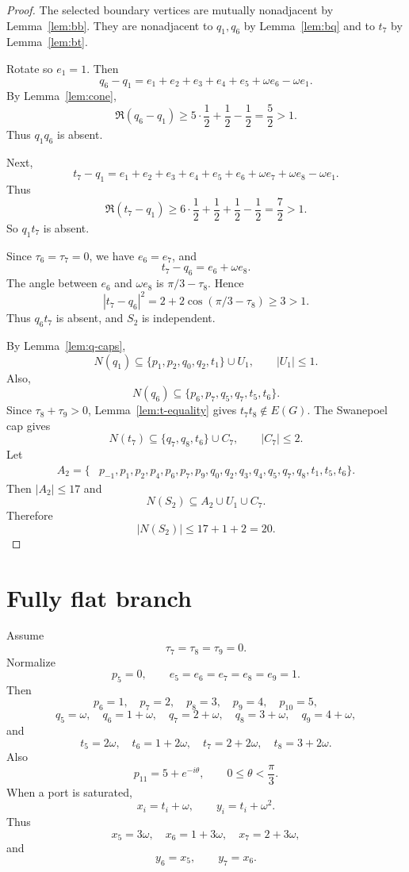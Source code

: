 \documentclass[11pt]{article}
\theoremstyle{plain}
\numberwithin{equation}{section}
\begin{document}
\begin{proof}
The selected boundary vertices are mutually nonadjacent by Lemma~\ref{lem:bb}. They are nonadjacent to $q_1,q_6$ by Lemma~\ref{lem:bq} and to $t_7$ by Lemma~\ref{lem:bt}.

Rotate so $e_1=1$. Then
\[
 q_6-q_1=e_1+e_2+e_3+e_4+e_5+\omega e_6-\omega e_1.
\]
By Lemma~\ref{lem:cone},
\[
 \Re(q_6-q_1)\ge5\cdot\frac12+\frac12-\frac12=\frac52>1.
\]
Thus $q_1q_6$ is absent.

Next,
\[
 t_7-q_1=e_1+e_2+e_3+e_4+e_5+e_6+\omega e_7+\omega e_8-\omega e_1.
\]
Thus
\[
 \Re(t_7-q_1)\ge6\cdot\frac12+\frac12+\frac12-\frac12=\frac72>1.
\]
So $q_1t_7$ is absent.

Since $\tau_6=\tau_7=0$, we have $e_6=e_7$, and
\[
 t_7-q_6=e_6+\omega e_8.
\]
The angle between $e_6$ and $\omega e_8$ is $\pi/3-\tau_8$. Hence
\[
 |t_7-q_6|^2=2+2\cos(\pi/3-\tau_8)\ge3>1.
\]
Thus $q_6t_7$ is absent, and $S_2$ is independent.

By Lemma~\ref{lem:q-caps},
\[
 N(q_1)\subseteq\{p_1,p_2,q_0,q_2,t_1\}\cup U_1,
 \qquad |U_1|\le1.
\]
Also,
\[
 N(q_6)\subseteq\{p_6,p_7,q_5,q_7,t_5,t_6\}.
\]
Since $\tau_8+\tau_9>0$, Lemma~\ref{lem:t-equality} gives $t_7t_8\notin E(G)$. The Swanepoel cap gives
\[
 N(t_7)\subseteq\{q_7,q_8,t_6\}\cup C_7,
 \qquad |C_7|\le2.
\]
Let
\[
\begin{aligned}
A_2=\{&p_{-1},p_1,p_2,p_4,p_6,p_7,p_9,q_0,q_2,q_3,q_4,q_5,q_7,q_8,t_1,t_5,t_6\}.
\end{aligned}
\]
Then $|A_2|\le17$ and
\[
 N(S_2)\subseteq A_2\cup U_1\cup C_7.
\]
Therefore
\[
 |N(S_2)|\le17+1+2=20.
\]
\end{proof}

\section{Fully flat branch}

Assume
\[
 \tau_7=\tau_8=\tau_9=0.
\]
Normalize
\[
 p_5=0,
 \qquad
 e_5=e_6=e_7=e_8=e_9=1.
\]
Then
\[
 p_6=1,
 \quad p_7=2,
 \quad p_8=3,
 \quad p_9=4,
 \quad p_{10}=5,
\]
\[
 q_5=\omega,
 \quad q_6=1+\omega,
 \quad q_7=2+\omega,
 \quad q_8=3+\omega,
 \quad q_9=4+\omega,
\]
and
\[
 t_5=2\omega,
 \quad t_6=1+2\omega,
 \quad t_7=2+2\omega,
 \quad t_8=3+2\omega.
\]
Also
\[
 p_{11}=5+e^{-i\theta},
 \qquad 0\le\theta<\frac{\pi}{3}.
\]
When a port is saturated,
\[
 x_i=t_i+\omega,
 \qquad y_i=t_i+\omega^2.
\]
Thus
\[
 x_5=3\omega,
 \quad x_6=1+3\omega,
 \quad x_7=2+3\omega,
\]
and
\[
 y_6=x_5,
 \qquad y_7=x_6.
\]
\end{document}
